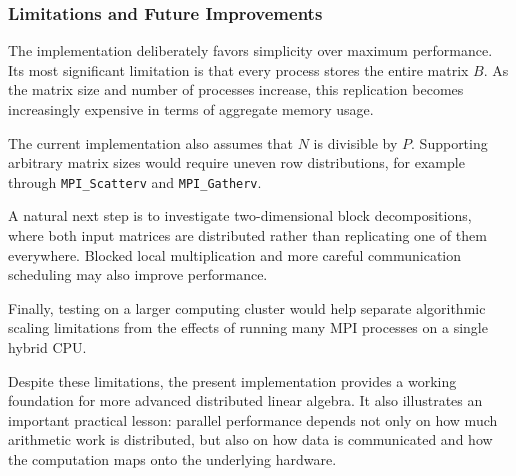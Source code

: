 \subsubsection{Limitations and Future Improvements}

The implementation deliberately favors simplicity over maximum performance. Its most significant limitation is that every process stores the entire matrix $B$. As the matrix size and number of processes increase, this replication becomes increasingly expensive in terms of aggregate memory usage.

The current implementation also assumes that $N$ is divisible by $P$. Supporting arbitrary matrix sizes would require uneven row distributions, for example through \texttt{MPI\_Scatterv} and \texttt{MPI\_Gatherv}.

A natural next step is to investigate two-dimensional block decompositions, where both input matrices are distributed rather than replicating one of them everywhere. Blocked local multiplication and more careful communication scheduling may also improve performance.

Finally, testing on a larger computing cluster would help separate algorithmic scaling limitations from the effects of running many MPI processes on a single hybrid CPU.

Despite these limitations, the present implementation provides a working foundation for more advanced distributed linear algebra. It also illustrates an important practical lesson: parallel performance depends not only on how much arithmetic work is distributed, but also on how data is communicated and how the computation maps onto the underlying hardware.






%
%
